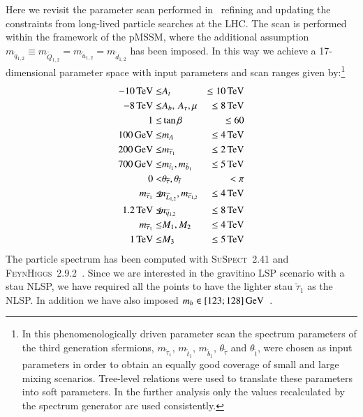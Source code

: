 \documentclass[preprint,number,sort&compress,twocolumn,3p]{elsstyarticle}
\def\bea{\begin{eqnarray}}
\def\eea{\end{eqnarray}}
\newcommand{\stau}{{\widetilde{\tau}}}
\newcommand{\mstau}{m_{\stau_1}}
\newcommand{\thest}{\theta_{\stau}}
\newcommand{\s}[1]{\widetilde{#1}}
\newcommand{\GEV}{\ensuremath{\,\textnormal{GeV}}}
\newcommand{\TEV}{\ensuremath{\,\textnormal{TeV}}}
\begin{document}
Here we revisit the parameter scan performed in~\cite{Heisig:2013rya,Heisig:2013sva} refining and updating the 
constraints from long-lived particle searches at the LHC\@. 
The scan is performed within the framework of the pMSSM, where
the additional assumption $ m_{\s q_{1,2}}\equiv m_{\s Q_{1,2}}=  m_{\s u_{1,2}}\!= m_{\s d_{1,2}}$ has been imposed. In this way we
achieve a 17-dimensional parameter space with input parameters and scan ranges given by:\footnote{In this phenomenologically driven parameter scan the spectrum parameters of the third generation sfermions, 
$\mstau, \,m_{\tilde{t}_1}, \,m_{\tilde{b}_1}, \,\thest$ and $ \theta_{\tilde{t}}$, were 
chosen as input parameters in order to obtain an equally good
coverage of small and large mixing scenarios. Tree-level relations were used to translate these 
parameters into soft parameters. In the further analysis only the values recalculated by the spectrum 
generator are used consistently.}
\bea
-10\TEV \le &A_t &\le10\TEV \nonumber \\
-8\TEV \le &A_b,\,A_\tau, \mu& \le8\TEV \nonumber \\
1 \le & \tan\beta & \le 60 \nonumber \\
100\GEV \le &  m_A  & \le 4\TEV \nonumber \\
200\GEV \le & \mstau & \le 2\TEV \nonumber \\
700\GEV \le & m_{\tilde{t}_1}, m_{\tilde{b}_1} & \le 5\TEV \label{eq:scanranges}\\
0 < &  \thest, \theta_{\tilde{t}} & < \pi \nonumber \\
\mstau  \le & \!\!m_{\s L_{1,2}}, m_{\s e_{1,2}} \!\!& \le  4\TEV \nonumber \\
1.2\TEV\le & \!\!m_{\s q_{1,2}}\!\!
& \le  8\TEV \nonumber \\
\mstau  \le &  M_1, M_2 & \le  4\TEV \nonumber \\
1\TEV \le & M_3 & \le  5\TEV \nonumber 
\eea
The particle spectrum has been computed with \textsc{SuSpect}~2.41 \cite{Djouadi:2002ze}
and \textsc{FeynHiggs}~2.9.2~\cite{Heinemeyer:1998yj}. 
Since we are interested in the gravitino LSP scenario with a stau NLSP, we have required all the points to have the lighter stau $\stau_1$ as the NLSP. In addition we have also imposed $m_h  \in [123;128]\GEV$~\cite{pdg,Degrassi:2002fi}.
\end{document}
